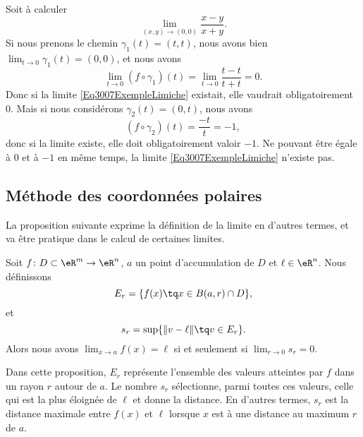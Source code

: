 \begin{example}
	Soit à calculer
	\begin{equation}	\label{Eq3007ExempleLimiche}
		\lim_{(x,y)\to(0,0)}\frac{ x-y }{ x+y }.
	\end{equation}
	Si nous prenons le chemin $\gamma_1(t)=(t,t)$, nous avons bien $\lim_{t\to 0} \gamma_1(t)=(0,0)$, et nous avons
	\begin{equation}
		\lim_{t\to 0} (f\circ\gamma_1)(t)=\lim_{t\to 0} \frac{ t-t }{ t+t }=0.
	\end{equation}
	Donc si la limite \eqref{Eq3007ExempleLimiche} existait, elle vaudrait obligatoirement $0$. Mais si nous considérons $\gamma_2(t)=(0,t)$, nous avons
	\begin{equation}
		(f\circ\gamma_2)(t)=\frac{ -t }{ t }=-1,
	\end{equation}
	donc si la limite existe, elle doit obligatoirement valoir $-1$. Ne pouvant être égale à $0$ et à $-1$ en même temps, la limite \eqref{Eq3007ExempleLimiche} n'existe pas.
\end{example}

\subsection{Méthode des coordonnées polaires}

La proposition suivante exprime la définition de la limite en d'autres termes, et va être pratique dans le calcul de certaines limites.
\begin{proposition}		\label{PropMethodePolaire}
	Soit $f\colon D\subset\eR^m\to \eR^n$, $a$ un point d'accumulation de $D$ et $\ell\in \eR^n$. Nous définissons
	\begin{equation}
		E_r=\{ f(x)\tq x\in B(a,r)\cap D \},
	\end{equation}
	et
	\begin{equation}
		s_r=\sup\{ \| v-\ell \|\tq v\in E_r \}.
	\end{equation}
	Alors nous avons $\lim_{x\to a} f(x)=\ell$ si et seulement si $\lim_{r\to 0} s_r=0$.
\end{proposition}

Dans cette proposition, $E_r$ représente l'ensemble des valeurs atteintes par $f$ dans un rayon $r$ autour de $a$. Le nombre $s_r$ sélectionne, parmi toutes ces valeurs, celle qui est la plus éloignée de $\ell$ et donne la distance. En d'autres termes, $s_r$ est la distance maximale entre $f(x)$ et $\ell$ lorsque $x$ est à une distance au maximum $r$ de $a$.

